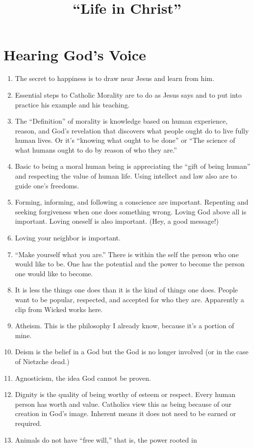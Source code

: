 \documentclass[10pt]{article}
\title{``Life in Christ''}
\begin{document}
\section{Hearing God's Voice}
\begin{enumerate}
\item The secret to happiness is to draw near Jesus and learn from him.
\item Essential steps to Catholic Morality are to do as Jesus says and 
	to put into practice his example and his teaching.
\item The ``Definition'' of morality is knowledge based on human 
	experience, reason, and God's revelation that discovers what 
	people ought do to live fully human lives.  Or it's ``knowing 
	what ought to be done'' or ``The science of what humans ought 
	to do by reason of who they are.''
\item Basic to being a moral human being is appreciating the ``gift of 
	being human'' and respecting the value of human life.  Using 
	intellect and law also are to guide one's freedoms.
\item Forming, informing, and following a conscience are important.  
	Repenting and seeking forgiveness when one does something 
	wrong.  Loving God above all is important.  Loving oneself is 
	also important.  (Hey, a good message!)
\item Loving your neighbor is important.
\item ``Make yourself what you are.'' There is within the self the 
	person who one would like to be.  One has the potential and 
	the power to become the person one would like to become.
\item It is less the things one does than it is the kind of things one
	does.  People want to be popular, respected, and accepted for 
	who they are.  Apparently a clip from Wicked works here.
\item Atheism.  This is the philosophy I already know, because it's a 
	portion of mine.
\item Deism is the belief in a God but the God is no longer involved 
	(or in the case of Nietzche dead.)
\item Agnosticism, the idea God cannot be proven.
\item Dignity is the quality of being worthy of esteem or respect.  
	Every human person has worth and value.  Catholics view this 
	as being because of our creation in God's image.  Inherent 
	means it does not need to be earned or required.
\item Animals do not have ``free will,'' that is, the power rooted in 

\end{enumerate}
\end{document}
